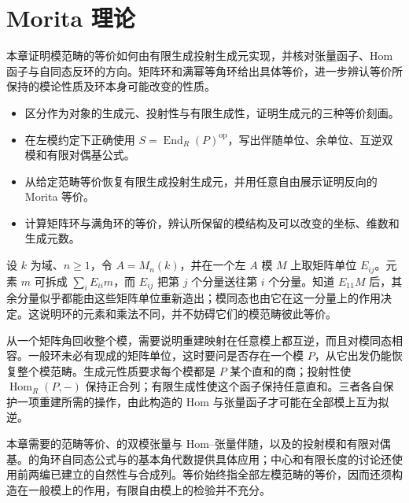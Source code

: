 
\chapter{Morita 理论}
\label{b2:ch:16}

\begin{chapterabstract}
	本章证明模范畴的等价如何由有限生成投射生成元实现，并核对张量函子、Hom 函子与自同态反环的方向。矩阵环和满幂等角环给出具体等价，进一步辨认等价所保持的模论性质及环本身可能改变的性质。
\end{chapterabstract}

\begin{learninggoals}
	\begin{itemize}
		\item 区分作为对象的生成元、投射性与有限生成性，证明生成元的三种等价刻画。
		\item 在左模约定下正确使用 \(S=\operatorname{End}_R(P)^{\mathrm{op}}\)，写出伴随单位、余单位、互逆双模和有限对偶基公式。
		\item 从给定范畴等价恢复有限生成投射生成元，并用任意自由展示证明反向的 Morita 等价。
		\item 计算矩阵环与满角环的等价，辨认所保留的模结构及可以改变的坐标、维数和生成元数。
	\end{itemize}
\end{learninggoals}

设 \(k\) 为域、\(n\ge1\)，令 \(A=M_n(k)\)，并在一个左 \(A\) 模 \(M\) 上取矩阵单位 \(E_{ij}\)。元素 \(m\) 可拆成 \(\sum_iE_{ii}m\)，而 \(E_{ij}\) 把第 \(j\) 个分量送往第 \(i\) 个分量。知道 \(E_{11}M\) 后，其余分量似乎都能由这些矩阵单位重新造出；模同态也由它在这一分量上的作用决定。这说明环的元素和乘法不同，并不妨碍它们的模范畴彼此等价。

\ProseParagraphBreak

从一个矩阵角回收整个模，需要说明重建映射在任意模上都互逆，而且对模同态相容。一般环未必有现成的矩阵单位，这时要问是否存在一个模 \(P\)，从它出发仍能恢复整个模范畴。生成元性质要求每个模都是 \(P\) 某个直和的商；投射性使 \(\operatorname{Hom}_R(P,-)\) 保持正合列；有限生成性使这个函子保持任意直和。三者各自保护一项重建所需的操作，由此构造的 Hom 与张量函子才可能在全部模上互为拟逆。

\ProseParagraphBreak

本章需要的范畴等价、的双模张量与 Hom–张量伴随，以及的投射模和有限对偶基。的角环自同态公式与的基本角代数提供具体应用；中心和有限长度的讨论还使用前两编已建立的自然性与合成列。等价始终指全部左模范畴的等价，因而还须构造在一般模上的作用，有限自由模上的检验并不充分。

